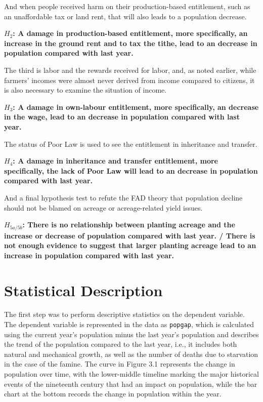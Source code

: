 And when people received harm on their production-based entitlement, such as an unaffordable tax or land rent, that will also leads to a population decrease.

\textbf{$H_2$: A damage in production-based entitlement, more specifically, an increase in the ground rent and to tax the tithe, lead to an decrease in population compared with last year.}

The third is labor and the rewards received for labor, and, as noted earlier, while farmers' incomes were almost never derived from income compared to citizens, it is also necessary to examine the situation of income.

\textbf{$H_3$: A damage in own-labour entitlement, more specifically, an decrease in the wage, lead to an decrease in population compared with last year.}

The status of Poor Law is used to see the entitlement in inheritance and transfer.

\textbf{$H_4$: A damage in inheritance and transfer entitlement, more specifically, the lack of Poor Law will lead to an decrease in population compared with last year.}

And a final hypothesis test to refute the FAD theory that population decline should not be blamed on acreage or acreage-related yield issues.

\textbf{$H_{5a/5b}$: There is no relationship between planting acreage and the increase or decrease of population compared with last year. / There is not enough evidence to suggest that larger planting acreage lead to an increase in population compared with last year.}

\newpage

\section{Statistical Description}

The first step was to perform descriptive statistics on the dependent variable. The dependent variable is represented in the data as \texttt{popgap}, which is calculated using the current year's population minus the last year's population and describes the trend of the population compared to the last year, i.e., it includes both natural and mechanical growth, as well as the number of deaths due to starvation in the case of the famine. The curve in Figure 3.1 represents the change in population over time, with the lower-middle timeline marking the major historical events of the nineteenth century that had an impact on population, while the bar chart at the bottom records the change in population within the year.

